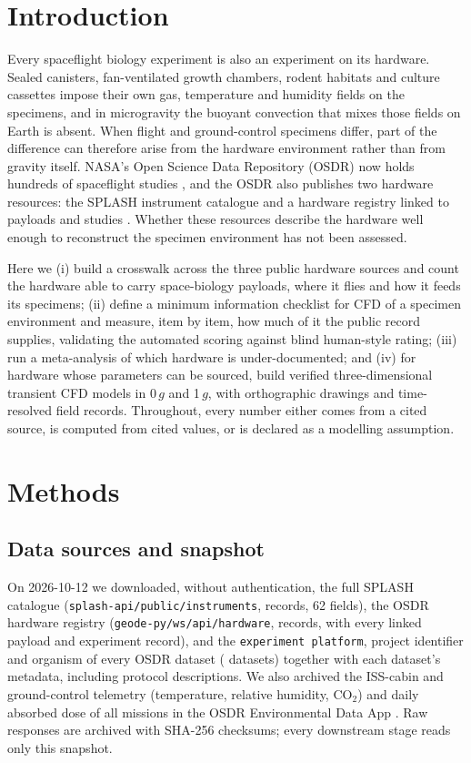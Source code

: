 \documentclass[11pt]{article}
\begin{document}
\section{Introduction}
Every spaceflight biology experiment is also an experiment on its hardware. Sealed canisters,
fan-ventilated growth chambers, rodent habitats and culture cassettes impose their own gas,
temperature and humidity fields on the specimens, and in microgravity the buoyant convection that
mixes those fields on Earth is absent. When flight and ground-control specimens differ, part of the
difference can therefore arise from the hardware environment rather than from gravity itself. NASA's
Open Science Data Repository (OSDR) now holds hundreds of spaceflight studies \citep{gebre2025,berrios2021},
and the OSDR also publishes two hardware resources: the SPLASH instrument catalogue \citep{splash} and a
hardware registry linked to payloads and studies \citep{osdrapi}. Whether these resources describe the
hardware well enough to reconstruct the specimen environment has not been assessed.

Here we (i) build a crosswalk across the three public hardware sources and count the hardware able to
carry space-biology payloads, where it flies and how it feeds its specimens; (ii) define a minimum
information checklist for CFD of a specimen environment and measure, item by item, how much of it the
public record supplies, validating the automated scoring against blind human-style rating; (iii) run a
meta-analysis of which hardware is under-documented; and (iv) for hardware whose parameters can be
sourced, build verified three-dimensional transient CFD models in 0\,$g$ and 1\,$g$, with orthographic
drawings and time-resolved field records. Throughout, every number either comes from a cited source,
is computed from cited values, or is declared as a modelling assumption.

\section{Methods}
\subsection{Data sources and snapshot}
On 2026-10-12 we downloaded, without authentication, the full SPLASH catalogue
(\nolinkurl{splash-api/public/instruments}, \hwNSplash{} records, 62 fields), the OSDR hardware registry
(\nolinkurl{geode-py/ws/api/hardware}, \hwNRegistry{} records, with every linked payload and experiment
record), and the \texttt{experiment platform}, project identifier and organism of every OSDR dataset
(\hwNDatasets{} datasets) together with each dataset's metadata, including protocol descriptions.
We also archived the ISS-cabin and ground-control telemetry (temperature, relative humidity, CO$_2$) and
daily absorbed dose of all \hwNEdaMissions{} missions in the OSDR Environmental Data App \citep{eda}.
Raw responses are archived with SHA-256 checksums; every downstream stage reads only this snapshot.
\end{document}
